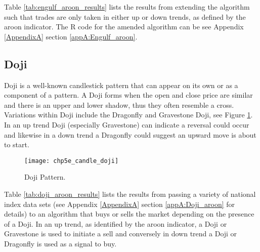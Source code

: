

Table \ref{tab:engulf_aroon_results} lists the results from extending the algorithm such that trades are only taken in either up or down trends, as defined by the aroon indicator. The R code for the amended algorithm can be see Appendix \ref{AppendixA} section \ref{appA:Engulf_aroon}.



\subsection{Doji}
Doji is a well-known candlestick pattern that can appear on its own or as a component of a pattern. A Doji forms when the open and close price are similar and there is an upper and lower shadow, thus they often resemble a cross. Variations within Doji include the Dragonfly and Gravestone Doji, see Figure \ref{fig:chp5e:doji}. In an up trend Doji (especially Gravestone) can indicate a reversal could occur and likewise in a down trend a Dragonfly could suggest an upward move is about to start.

\begin{figure}[tbph]
\centering
\texttt{[image: chp5e\_candle\_doji]}
\caption[ Doji Star.]{Doji Pattern.}
\label{fig:chp5e:doji}
\end{figure}

Table \ref{tab:doji_aroon_results} lists the results from passing a variety of national index data sets (see Appendix \ref{AppendixA} section \ref{appA:Doji_aroon} for details) to an algorithm that buys or sells the market depending on the presence of a Doji. In an up trend, as identified by the aroon indicator, a Doji or Gravestone is used to initiate a sell and conversely in down trend a Doji or Dragonfly is used as a signal to buy.


 